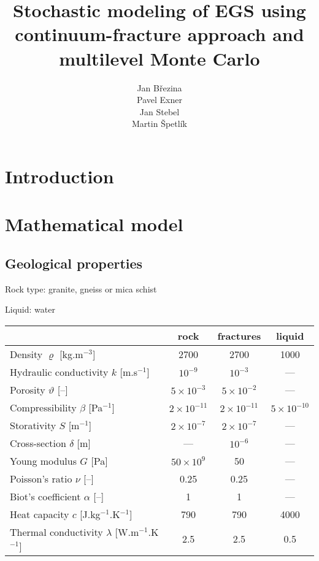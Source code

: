 \documentclass{article}
\title{Stochastic modeling of EGS using continuum-fracture approach and multilevel Monte Carlo}
\author{
  Jan Březina \\
  \And
  Pavel Exner \\
  \And
  Jan Stebel \\
  \And
  Martin Špetlík \\
}
\begin{document}
\maketitle

\begin{abstract}

\end{abstract}




\section{Introduction}



\section{Mathematical model}

\subsection{Geological properties}

Rock type: granite, gneiss or mica schist \cite{capova} %

Liquid: water

\begin{tabular}{|l|c|c|c|}
\hline
 & rock & fractures & liquid\\\hline
Density $\varrho$ [kg.m${}^{-3}$] & 2700 & 2700 & 1000 \\
Hydraulic conductivity $k$ [m.s${}^{-1}$] & $10^{-9}$ \cite{sperl-trckova} & $10^{-3}$ & ---\\
Porosity $\vartheta$ [--] & $5\times10^{-3}$ \cite{intera} & $5\times10^{-2}$ & --- \\
Compressibility $\beta$ [Pa${}^{-1}$] & $2\times10^{-11}$ \cite{zisman} & $2\times10^{-11}$ & $5\times10^{-10}$ \\
Storativity $S$ [m${}^{-1}$] & $2\times10^{-7}$ & $2\times10^{-7}$ & --- \\
Cross-section $\delta$ [m] & --- & $10^{-6}$ & --- \\
\hline
Young modulus $G$ [Pa] & $50\times10^9$ \cite{ljunggren} & 50 & --- \\
Poisson's ratio $\nu$ [--] & 0.25 \cite{ljunggren} & 0.25 & --- \\
Biot's coefficient $\alpha$ [--] & 1 & 1 & --- \\
\hline
Heat capacity $c$ [J.kg${}^{-1}$.K${}^{-1}$] & 790 & 790 & 4000 \\
Thermal conductivity $\lambda$ [W.m${}^{-1}$.K${}^{-1}$] & 2.5 & 2.5 & 0.5 \\
\hline
\end{tabular}
\end{document}
